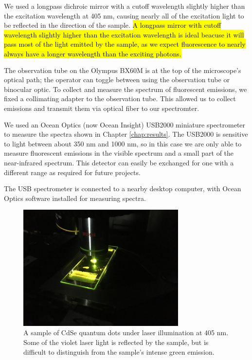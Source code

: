 We used a longpass dichroic mirror with a cutoff wavelength slightly higher than the excitation wavelength at 405 nm, causing nearly all of the excitation light to be reflected in the direction of the sample. \hl{A longpass mirror with cutoff wavelength slightly higher than the excitation wavelength is ideal beacuse it will pass most of the light emitted by the sample, as we expect fluorescence to nearly always have a longer wavelength than the exciting photons.}


The observation tube on the Olympus BX60M is at the top of the microscope's optical path; the operator can toggle between using the observation tube or binocular optic. To collect and measure the spectrum of fluorescent emissions, we fixed a collimating adapter to the observation tube. This allowed us to collect emissions and transmit them via optical fiber to our spectromter.

We used an Ocean Optics (now Ocean Insight) USB2000 miniature spectrometer to measure the spectra shown in Chapter \ref{chap:results}. The USB2000 is sensitive to light between about 350 nm and 1000 nm, so in this case we are only able to measure fluorescent emissions in the visible spectrum and a small part of the near-infrared spectrum. This detector can easily be exchanged for one with a different range as required for future projects.

The USB spectrometer is connected to a nearby desktop computer, with Ocean Optics software installed for measuring spectra.

\begin{figure}[H]
    \centering
    \includegraphics[width=0.75\textwidth]{img/objective-sample.JPG}
    \caption[Sample on stage under laser illumination.]{A sample of CdSe quantum dots under laser illumination at 405 nm. Some of the violet laser light is reflected by the sample, but is difficult to distinguish from the sample's intense green emission.}
    \label{img:objective-sample}
\end{figure}


